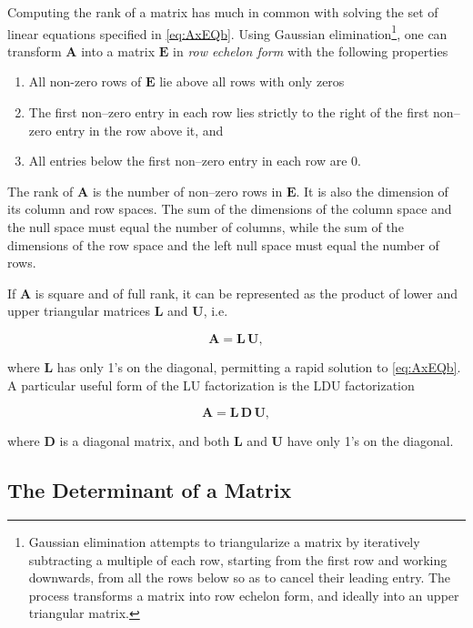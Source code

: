 \documentclass[graybox,envcountchap,sectrefs]{svmono}\usepackage[]{graphicx}\usepackage[]{xcolor}
\begin{document}
\begin{appendices}
Computing the rank of a matrix has much in common with solving the
set of linear equations specified in \eqref{eq:AxEQb}. Using Gaussian
elimination\footnote{Gaussian elimination attempts to triangularize a matrix by iteratively
subtracting a multiple of each row, starting from the first row and
working downwards, from all the rows below so as to cancel their leading
entry. The process transforms a matrix into row echelon form, and
ideally into an upper triangular matrix.}, one can transform $\mathrm{\mathbf{A}}$ into a matrix $\mathbf{E}$
in \emph{row echelon form} with the following properties
\begin{enumerate}
\item All non-zero rows of $\mathbf{E}$ lie above all rows with only zeros
\item The first non--zero entry in each row lies strictly to the right
of the first non--zero entry in the row above it, and
\item All entries below the first non--zero entry in each row are 0.
\end{enumerate}
The rank of $\mathbf{A}$ is the number of non--zero rows in $\mathbf{E}$.
It is also the dimension of its column and row spaces. The sum of
the dimensions of the column space and the null space must equal the
number of columns, while the sum of the dimensions of the row space
and the left null space must equal the number of rows.

If $\mathrm{\mathbf{A}}$ is square and of full rank, it can be represented
as the product of lower and upper triangular matrices $\mathrm{\mathbf{L}}$
and $\mathrm{\mathbf{U}}$, i.e.

\begin{equation}
\mathrm{\mathbf{A}}=\mathrm{\mathbf{L}}\,\mathrm{\mathbf{U},}\label{eq:AequalsLU}
\end{equation}

where $\mathrm{\mathbf{L}}$ has only 1's on the diagonal, permitting
a rapid solution to \eqref{eq:AxEQb}. A particular useful form of
the LU factorization is the LDU factorization

\begin{equation}
\mathrm{\mathbf{A}}=\mathrm{\mathbf{L}}\,\mathrm{\mathbf{D}}\,\mathbf{U},\label{eq:AequalsLDU}
\end{equation}

where $\mathrm{\mathbf{D}}$ is a diagonal matrix, and both $\mathrm{\mathbf{L}}$
and $\mathrm{\mathbf{U}}$ have only 1's on the diagonal. 

\subsection{The Determinant of a Matrix}


\end{appendices}
\end{document}
